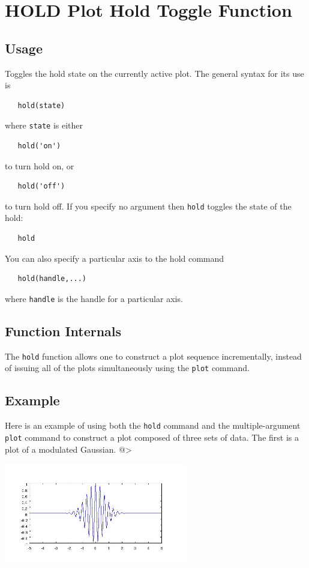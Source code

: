 \section{HOLD Plot Hold Toggle Function}

\subsection{Usage}

Toggles the hold state on the currently active plot.  The
general syntax for its use is
\begin{verbatim}
   hold(state)
\end{verbatim}
where \verb|state| is either
\begin{verbatim}
   hold('on')
\end{verbatim}
to turn hold on, or
\begin{verbatim}
   hold('off')
\end{verbatim}
to turn hold off. If you specify no argument then
\verb|hold| toggles the state of the hold:
\begin{verbatim}
   hold
\end{verbatim}
You can also specify a particular axis to the hold command
\begin{verbatim}
   hold(handle,...)
\end{verbatim}
where \verb|handle| is the handle for a particular axis.
\subsection{Function Internals}

The \verb|hold| function allows one to construct a plot sequence
incrementally, instead of issuing all of the plots simultaneously
using the \verb|plot| command.
\subsection{Example}

Here is an example of using both the \verb|hold| command and the
multiple-argument \verb|plot| command to construct a plot composed
of three sets of data.  The first is a plot of a modulated Gaussian.
@>


\centerline{\includegraphics[width=8cm]{hold1}}


